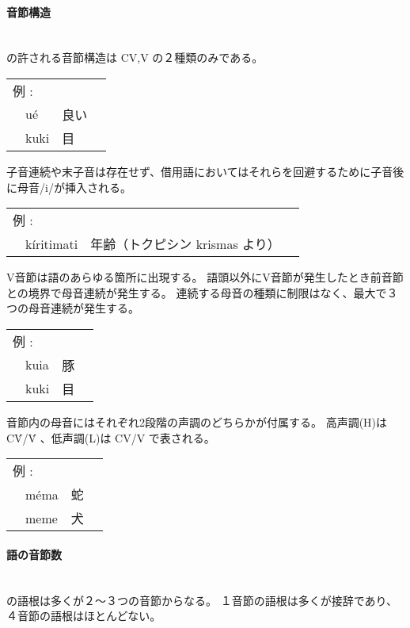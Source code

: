 \paragraph{音節構造}\quad\\
\langname の許される音節構造は CV,V の２種類のみである。

\begin{tabular}{llll}
    \multicolumn{2}{l}{例 : } \\ 
    & u\'e & 良い \\
    & kuki & 目 \\
\end{tabular}

子音連続や末子音は存在せず、借用語においてはそれらを回避するために子音後に母音/i/が挿入される。

\begin{tabular}{llll}
    \multicolumn{2}{l}{例 : } \\ 
    & k\'iritimati & 年齢（トクピシン krismas より） \\
\end{tabular}

V音節は語のあらゆる箇所に出現する。
語頭以外にV音節が発生したとき前音節との境界で母音連続が発生する。
連続する母音の種類に制限はなく、最大で３つの母音連続が発生する。

\begin{tabular}{llll}
    \multicolumn{2}{l}{例 : } \\ 
    & kuia & 豚 \\
    & kuki & 目 \\
\end{tabular}

音節内の母音にはそれぞれ2段階の声調のどちらかが付属する。
高声調(H)は C\'V/\'V 、低声調(L)は CV/V で表される。

\begin{tabular}{llll}
    \multicolumn{2}{l}{例 : } \\ 
    & m\'ema & 蛇 \\
    & meme & 犬 \\
\end{tabular}

\paragraph{語の音節数}\quad\\
\langname の語根は多くが２～３つの音節からなる。
１音節の語根は多くが接辞であり、４音節の語根はほとんどない。

